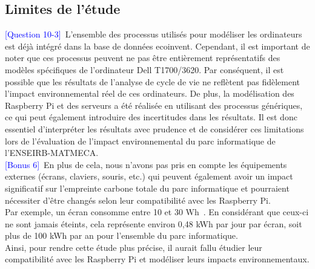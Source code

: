 \documentclass[12pt,a4paper]{paper}
\begin{document}
\subsection{Limites de l'étude}
\textcolor{blue}{[Question 10-3]}~L'ensemble des processus utilisés pour modéliser les ordinateurs est déjà intégré dans la base de données ecoinvent. Cependant, il est important de noter que ces processus peuvent ne pas être entièrement représentatifs des modèles spécifiques de l'ordinateur Dell T1700/3620. Par conséquent, il est possible que les résultats de l'analyse de cycle de vie ne reflètent pas fidèlement l'impact environnemental réel de ces ordinateurs. De plus, la modélisation des Raspberry Pi et des serveurs a été réalisée en utilisant des processus génériques, ce qui peut également introduire des incertitudes dans les résultats. Il est donc essentiel d'interpréter les résultats avec prudence et de considérer ces limitations lors de l'évaluation de l'impact environnemental du parc informatique de l'ENSEIRB-MATMECA.\\
\textcolor{blue}{[Bonus 6]}~En plus de cela, nous n'avons pas pris en compte les équipements externes (écrans, claviers, souris, etc.) qui peuvent également avoir un impact significatif sur l'empreinte carbone totale du parc informatique et pourraient nécessiter d'être changés selon leur compatibilité avec les Raspberry Pi. \\
Par exemple, un écran consomme entre 10 et 30 Wh~\cite{maitriserenergie2024}. En considérant que ceux-ci ne sont jamais éteints, cela représente environ 0,48 kWh par jour par écran, soit plus de 100 kWh par an pour l'ensemble du parc informatique. \\
Ainsi, pour rendre cette étude plus précise, il aurait fallu étudier leur compatibilité avec les Raspberry Pi et modéliser leurs impacts environnementaux.


\end{document}

